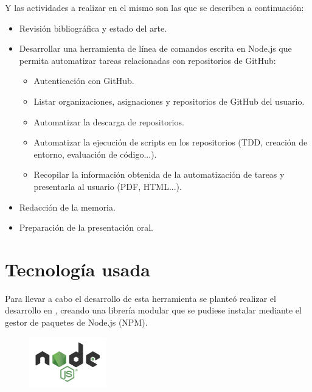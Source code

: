 Y las actividades a realizar en el mismo son las que se describen a continuación:
\begin{itemize}
  \item Revisión bibliográfica y estado del arte.
  \item Desarrollar una herramienta de línea de comandos escrita en Node.js que permita automatizar tareas relacionadas con repositorios de GitHub:
  \begin{itemize}
    \item Autenticación con GitHub.
    \item Listar organizaciones, asignaciones y repositorios de GitHub del usuario.
    \item Automatizar la descarga de repositorios.
    \item Automatizar la ejecución de scripts en los repositorios (TDD, creación de entorno, evaluación de código...).
    \item Recopilar la información obtenida de la automatización de tareas y presentarla al usuario (PDF, HTML...).
  \end{itemize}
  \item Redacción de la memoria.
  \item Preparación de la presentación oral.
\end{itemize}

\section{Tecnología usada}
\label{1:sec:3}
 
Para llevar a cabo el desarrollo de esta herramienta se planteó realizar el desarrollo en , creando una librería modular que se pudiese instalar mediante el gestor de paquetes de Node.js (NPM).

\begin{figure}[H]
\begin{center}
\includegraphics[width=0.3\textwidth]{images/nodejs-logo}
\end{center}
\end{figure}

